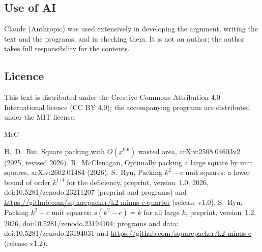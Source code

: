 \documentclass[11pt]{amsart}
\theoremstyle{definition}
\theoremstyle{remark}
\numberwithin{equation}{section}
\begin{document}
\subsection*{Use of AI}
Claude (Anthropic) was used extensively in developing the argument, writing the text and the programs, and in checking
them. It is not an author; the author takes full responsibility for the contents.

\subsection*{Licence}
This text is distributed under the Creative Commons Attribution 4.0 International licence (CC BY 4.0); the accompanying
programs are distributed under the MIT licence.

\begin{thebibliography}{McC}
\raggedright
{} H.~D.~Bui, Square packing with $O(x^{0.6})$ wasted area, arXiv:2508.04603v2 (2025, revised 2026).
 R.~McClenagan, Optimally packing a large square by unit squares, arXiv:2602.01484 (2026).
 S.~Ryu, Packing $k^2-c$ unit squares: a lower bound of order $k^{1/4}$ for the deficiency, preprint,
version~1.0, 2026, doi:10.5281/zenodo.23211207 (preprint and programs) and \url{https://github.com/squarepacker/k2-minus-c-quarter} (release v1.0).
 S.~Ryu, Packing $k^2-c$ unit squares: $s(k^2-c)=k$ for all large $k$, preprint, version~1.2, 2026,
doi:10.5281/zenodo.23194104; programs and data: doi:10.5281/zenodo.23194031 and
\url{https://github.com/squarepacker/k2-minus-c} (release v1.2).
\end{thebibliography}
\end{document}
